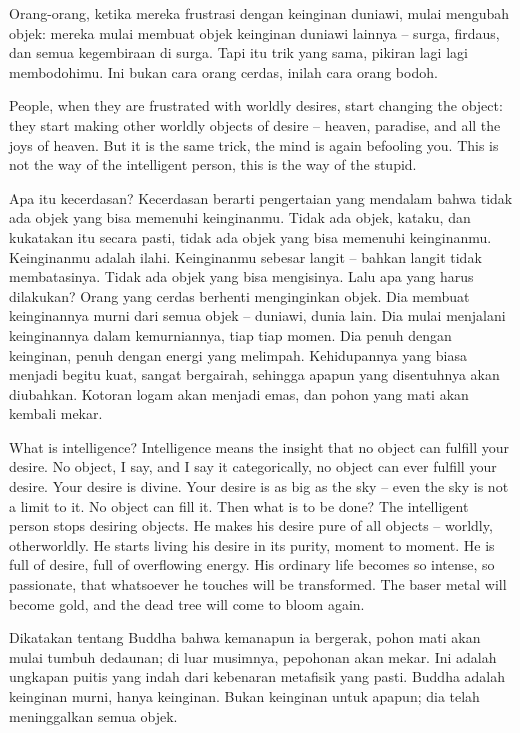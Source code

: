 \bahasa
Orang-orang, ketika mereka frustrasi dengan keinginan duniawi, mulai mengubah objek: mereka mulai membuat objek keinginan duniawi lainnya -- surga, firdaus, dan semua kegembiraan di surga. Tapi itu trik yang sama, pikiran lagi lagi membodohimu. Ini bukan cara orang cerdas, inilah cara orang bodoh.

\english
People, when they are frustrated with worldly desires, start changing the object: they start making other worldly objects of desire -- heaven, paradise, and all the joys of heaven. But it is the same trick, the mind is again befooling you. This is not the way of the intelligent person, this is the way of the stupid.

\bahasa
Apa itu kecerdasan? Kecerdasan berarti pengertaian yang mendalam bahwa tidak ada objek yang bisa memenuhi keinginanmu. Tidak ada objek, kataku, dan kukatakan itu secara pasti, tidak ada objek yang bisa memenuhi keinginanmu. Keinginanmu adalah ilahi. Keinginanmu sebesar langit -- bahkan langit tidak membatasinya. Tidak ada objek yang bisa mengisinya. Lalu apa yang harus dilakukan? Orang yang cerdas berhenti menginginkan objek. Dia membuat keinginannya murni dari semua objek -- duniawi, dunia lain. Dia mulai menjalani keinginannya dalam kemurniannya, tiap tiap momen. Dia penuh dengan keinginan, penuh dengan energi yang melimpah. Kehidupannya yang biasa menjadi begitu kuat, sangat bergairah, sehingga apapun yang disentuhnya akan diubahkan. Kotoran logam akan menjadi emas, dan pohon yang mati akan kembali mekar.

\english
What is intelligence? Intelligence means the insight that no object can fulfill your desire. No object, I say, and I say it categorically, no object can ever fulfill your desire. Your desire is divine. Your desire is as big as the sky -- even the sky is not a limit to it. No object can fill it. Then what is to be done? The intelligent person stops desiring objects. He makes his desire pure of all objects -- worldly, otherworldly. He starts living his desire in its purity, moment to moment. He is full of desire, full of overflowing energy. His ordinary life becomes so intense, so passionate, that whatsoever he touches will be transformed. The baser metal will become gold, and the dead tree will come to bloom again.

\bahasa
Dikatakan tentang Buddha bahwa kemanapun ia bergerak, pohon mati akan mulai tumbuh dedaunan; di luar musimnya, pepohonan akan mekar. Ini adalah ungkapan puitis yang indah dari kebenaran metafisik yang pasti. Buddha adalah keinginan murni, hanya keinginan. Bukan keinginan untuk apapun; dia telah meninggalkan semua objek.

